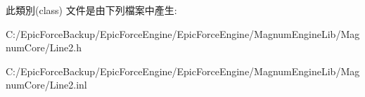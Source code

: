 此類別(class) 文件是由下列檔案中產生\+:\begin{DoxyCompactItemize}
\item 
C\+:/\+Epic\+Force\+Backup/\+Epic\+Force\+Engine/\+Epic\+Force\+Engine/\+Magnum\+Engine\+Lib/\+Magnum\+Core/Line2.\+h\item 
C\+:/\+Epic\+Force\+Backup/\+Epic\+Force\+Engine/\+Epic\+Force\+Engine/\+Magnum\+Engine\+Lib/\+Magnum\+Core/Line2.\+inl\end{DoxyCompactItemize}
